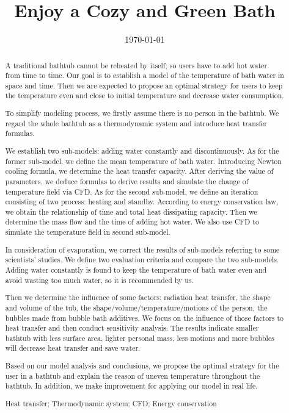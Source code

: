 \documentclass{mcmthesis}
\title{Enjoy a Cozy and Green Bath}
\date{\today}
\begin{document}
\begin{abstract}

A traditional bathtub cannot be reheated by itself, so users have to add hot water from time to time. Our goal is to establish a model of the temperature of bath water in space and time. Then we are expected to propose an optimal strategy for users to keep the temperature even and close to initial temperature and decrease water consumption.

To simplify modeling process, we firstly assume there is no person in the bathtub. We regard the whole bathtub as a thermodynamic system and introduce heat transfer formulas.

We establish two sub-models: adding water constantly and discontinuously. As for the former sub-model, we define the mean temperature of bath water. Introducing Newton cooling formula, we determine the heat transfer capacity. After deriving the value of parameters, we deduce formulas to derive results and simulate the change of temperature field via CFD. As for the second sub-model, we define an iteration consisting of two process: heating and standby. According to energy conservation law, we obtain the relationship of time and total heat dissipating capacity. Then we determine the mass flow and the time of adding hot water. We also use CFD to simulate the temperature field in second sub-model.

In consideration of evaporation, we correct the results of sub-models referring to some scientists' studies. We define two evaluation criteria and compare the two sub-models. Adding water constantly is found to keep the temperature of bath water even and avoid wasting too much water, so it is recommended by us.

Then we determine the influence of some factors: radiation heat transfer, the shape and volume of the tub, the shape/volume/temperature/motions of the person, the bubbles made from bubble bath additives. We focus on the influence of those factors to heat transfer and then conduct sensitivity analysis. The results indicate smaller bathtub with less surface area, lighter personal mass, less motions and more bubbles will decrease heat transfer and save water.

Based on our model analysis and conclusions, we propose the optimal strategy for the user in a bathtub and explain the reason of uneven temperature throughout the bathtub. In addition, we make improvement for applying our model in real life.

\begin{keywords}
Heat transfer; Thermodynamic system; CFD; Energy conservation
\end{keywords}

\end{abstract}
\end{document}
